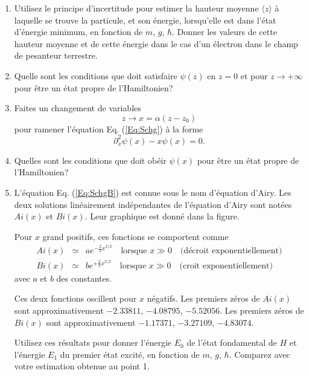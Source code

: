 \begin{enumerate}

\item
Utilisez le principe d'incertitude pour estimer la hauteur moyenne $\langle z  \rangle$ à laquelle se trouve la particule, et son énergie, lorsqu'elle est dans l'état d'énergie minimum, en fonction de $m$, $g$, $\hbar$. Donner les valeurs de cette hauteur moyenne et de cette énergie dans le cas d'un électron dans le champ de pesanteur terrestre.

\item
Quelle sont les conditions que doit satisfaire $\psi(z)$ en $z=0$ et pour $z\to +\infty$ pour être un état propre de l'Hamiltonien?

\item
Faites un changement de variables 
\begin{equation}
z \to x = \alpha (z-z_0)
\end{equation}
pour ramener l'équation Eq. (\ref{Eq:Schg}) à la forme
\begin{equation}
\partial_{x}^2  \psi (x) - x \psi (x)= 0 .
\label{Eq:SchgB}
\end{equation}

\item 
Quelles sont les conditions que doit obéir $\psi(x) $ pour être un état propre de l'Hamiltonien?

\item
L'équation  Eq. (\ref{Eq:SchgB}) est connue sous le nom d'équation d'Airy. Les deux solutions linéairement indépendantes de l'équation d'Airy sont notées $Ai(x)$ et $Bi(x)$. Leur graphique est donné dans la figure. 

Pour $x$ grand positifs, ces fonctions se comportent comme 
\begin{eqnarray}
Ai(x)  &\simeq& a e^{- \frac{2}{3} x^{3/2}} \quad \text{lorsque } x\gg 0 \quad \text{(décroit exponentiellement)}\\
Bi(x)  &\simeq&  b e^{+ \frac{2}{3} x^{3/2}} \quad \text{lorsque } x\gg 0 \quad \text{(croit exponentiellement)}
\end{eqnarray}
avec $a$ et $b$ des constantes.

Ces deux fonctions oscillent pour $x$ négatifs. Les premiers zéros de $Ai(x)$ sont approximativement $-2.33811$, $-4.08795$, $-5.52056$.
Les premiers zéros de  $Bi(x)$  sont approximativement $-1.17371$,  $ -3.27109$, $-4.83074$.

Utilisez ces résultats pour donner l'énergie $E_0$ de l'état fondamental de $H$ et l'énergie $E_1$ du premier état excité, en fonction de $m$, $g$, $\hbar$.
Comparez avec votre estimation obtenue au point 1.

\end{enumerate}